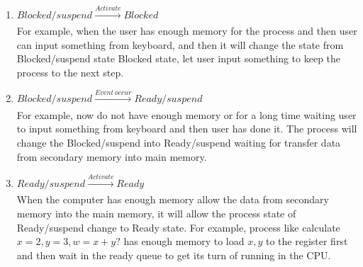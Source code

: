 \documentclass[12pt]{article}
\newenvironment{sol}[1][Solution]{\begin{trivlist}\item[\hskip\labelsep {\bfseries #1:}]}{\end{trivlist}}
\begin{document}
\begin{enumerate}
\begin{sol}
\begin{enumerate}
    \item $Blocked/suspend \xrightarrow[]{Activate} Blocked$\\
    For example, when the user has enough memory for the process and then user can input something from keyboard, and then it will change the state from Blocked/suspend state Blocked state, let user input something to keep the process to the next step. 
    \item $Blocked/suspend \xrightarrow[]{Event \ occur} Ready/suspend$\\
    For example, now do not have enough memory or for a long time waiting user to input something from keyboard and then user has done it. The process will change the Blocked/suspend into Ready/suspend waiting for transfer data from secondary memory into main memory.
    \item $Ready/suspend \xrightarrow[]{Activate} Ready$\\
    When the computer has enough memory allow the data from secondary memory into the main memory, it will allow the process state of Ready/suspend change to Ready state. For example, process like calculate $x=2, y= 3, w = x + y?$ has enough memory to load  $x, y$ to the register first and then wait in the ready queue to get its turn of running in the CPU.
    
    
\end{enumerate}

\end{sol}


\end{enumerate}
\end{document}
